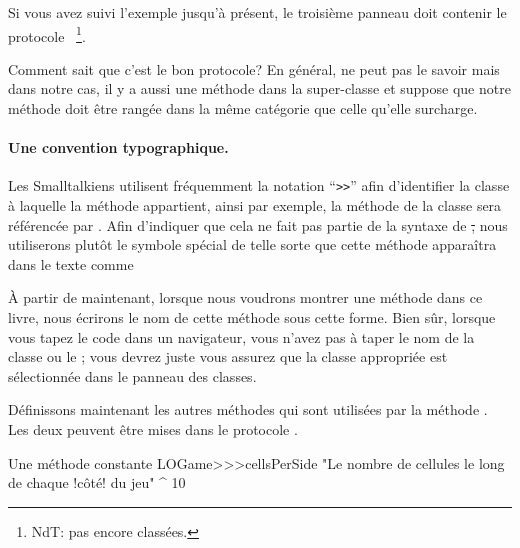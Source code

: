 \documentclass[a4paper,10pt,twoside]{book}
\begin{document}
Si vous avez suivi l'exemple jusqu'à présent, le troisième panneau doit contenir le protocole ~\footnote{NdT: pas encore classées.}. %

Comment \pharo sait que c'est le bon protocole? En général,
\pharo ne peut pas le savoir mais dans notre cas, il y a aussi une méthode  dans la super-classe et \pharo suppose que notre méthode  doit être rangée dans la même catégorie que celle qu'elle surcharge.


\paragraph{Une convention typographique.} Les Smalltalkiens utilisent fréquemment la notation ``\verb|>>|'' afin d'identifier la classe à laquelle la méthode appartient, ainsi par exemple, la méthode  de la classe  sera référencée par .
Afin d'indiquer que cela ne fait pas partie de la syntaxe de \st, nous utiliserons plutôt le symbole spécial \ct{>>>} de telle sorte que cette méthode apparaîtra dans le texte comme 

À partir de maintenant, lorsque nous voudrons montrer une méthode dans ce livre, nous écrirons le nom de cette méthode sous cette forme. Bien sûr, lorsque vous tapez le code dans un navigateur, vous n'avez pas à taper le nom de la classe ou le \ct{>>>}; vous devrez juste vous assurez que la classe appropriée est sélectionnée dans le panneau des classes.

Définissons maintenant les autres méthodes qui sont utilisées par la méthode . Les deux peuvent être mises dans le protocole .

\begin{method}[sbegamecellsperside]{Une méthode constante}
LOGame>>>cellsPerSide
   "Le nombre de cellules le long de chaque !côté! du jeu"
   ^ 10
\end{method}
\end{document}
